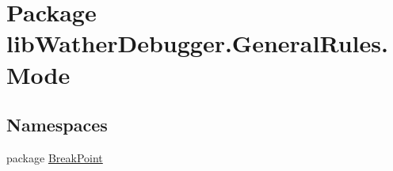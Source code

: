 \hypertarget{namespacelib_wather_debugger_1_1_general_rules_1_1_mode}{\section{Package lib\+Wather\+Debugger.\+General\+Rules.\+Mode}
\label{namespacelib_wather_debugger_1_1_general_rules_1_1_mode}
}
\subsection*{Namespaces}
\begin{DoxyCompactItemize}
\item 
package \hyperlink{namespacelib_wather_debugger_1_1_general_rules_1_1_mode_1_1_break_point}{Break\+Point}
\end{DoxyCompactItemize}
